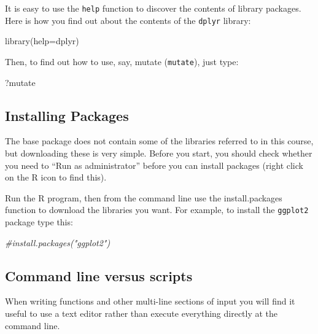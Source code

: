 \documentclass[
]{book}
\newenvironment{Shaded}{\begin{snugshade}}{\end{snugshade}}
\newcommand{\AttributeTok}[1]{\textcolor[rgb]{0.77,0.63,0.00}{#1}}
\newcommand{\CommentTok}[1]{\textcolor[rgb]{0.56,0.35,0.01}{\textit{#1}}}
\newcommand{\FunctionTok}[1]{\textcolor[rgb]{0.00,0.00,0.00}{#1}}
\newcommand{\NormalTok}[1]{#1}
\begin{document}
It is easy to use the \texttt{help} function to discover the contents of library packages. Here is how you find out about the contents of the \texttt{dplyr} library:

\begin{Shaded}
\begin{Highlighting}[]
\FunctionTok{library}\NormalTok{(}\AttributeTok{help=}\NormalTok{dplyr)}
\end{Highlighting}
\end{Shaded}

Then, to find out how to use, say, mutate (\texttt{mutate}), just type:

\begin{Shaded}
\begin{Highlighting}[]
\NormalTok{?mutate}
\end{Highlighting}
\end{Shaded}

\hypertarget{installing-packages}{%
\subsection{Installing Packages}\label{installing-packages}}

The base package does not contain some of the libraries referred to in this course, but downloading these is very simple. Before you start, you should check whether you need to ``Run as administrator'' before you can install packages (right click on the R icon to find this).

Run the R program, then from the command line use the install.packages function to download the libraries you want. For example, to install the \texttt{ggplot2} package type this:

\begin{Shaded}
\begin{Highlighting}[]
\CommentTok{\#install.packages("ggplot2")}
\end{Highlighting}
\end{Shaded}

\hypertarget{command-line-versus-scripts}{%
\subsection{Command line versus scripts}\label{command-line-versus-scripts}}

When writing functions and other multi-line sections of input you will find it useful to use a text editor rather than execute everything directly at the command line.
\end{document}
